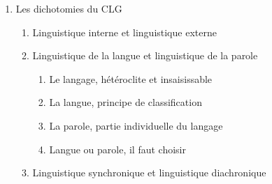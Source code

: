 \begin{keybox}
\begin{enumerate}[label=\arabic*.]
\begin{enumerate}[label=\textcircled{\scriptsize\arabic*}]
\item Dualité du signe linguistique : signifiant et signifié
\item Arbitraire du signe linguistique
\begin{enumerate}[label=\arabic*.]
\item L’arbitraire du signe chez Platon : le \textit{Cratyle}
\begin{enumerate}[label=\arabic*)]
\item La Thèse d’Hermogène
\item La Thèse de Cratyle
\item La Synthèse de Socrate
\end{enumerate}
\item L’arbitraire selon Saussure
\item Le cas des onomatopées
\end{enumerate}
\item La linéarité du signe linguistique
\item La notion de valeur linguistique
\begin{enumerate}[label=\arabic*.]
\item Chez Patañjali
\item Chez Saussure
\end{enumerate}
\item Immutabilité et mutabilité du signe linguistique
\begin{enumerate}[label=\arabic*.]
\item Immutabilité du signe
\item Mutabilité du signe
\end{enumerate}
\end{enumerate}
\item Les dichotomies du CLG
\begin{enumerate}[label=\textcircled{\scriptsize\arabic*}]
\item Linguistique interne et linguistique externe
\item Linguistique de la langue et linguistique de la parole
\begin{enumerate}[label=\arabic*.]
\item Le langage, hétéroclite et insaisissable
\item La langue, principe de classification
\item La parole, partie individuelle du langage
\item Langue ou parole, il faut choisir
\end{enumerate}
\item Linguistique synchronique et linguistique diachronique

\end{enumerate}
\end{enumerate}
\end{keybox}
